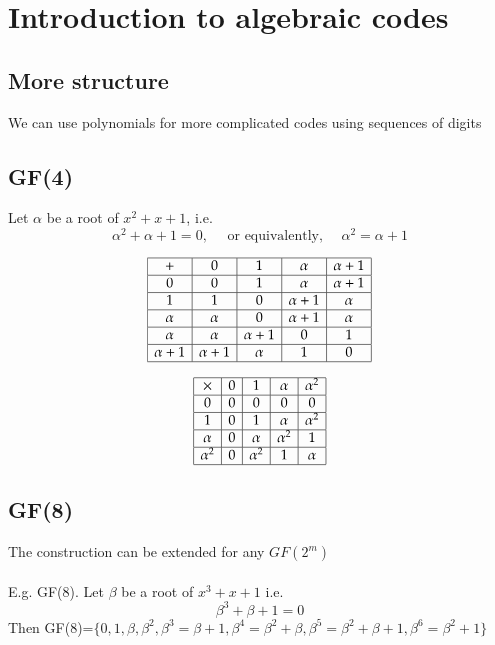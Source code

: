 \documentclass{article}[18pt]
\begin{document}
\section{Introduction to algebraic codes}
\subsection{More structure}
We can use polynomials for more complicated codes using sequences of digits
\subsection{GF(4)}
Let $\alpha$ be a root of $x^2+x+1$, i.e.
$$\alpha ^ { 2 } + \alpha + 1 = 0 , \quad \text { or equivalently, } \quad \alpha ^ { 2 } = \alpha + 1$$


$$\begin{array} { | c | c | c | c | c | } \hline + & { 0 } & { 1 } & { \alpha } & { \alpha + 1 } \\ \hline 0 & { 0 } & { 1 } & { \alpha } & { \alpha + 1 } \\ \hline 1 & { 1 } & { 0 } & { \alpha + 1 } & { \alpha } \\ \hline \alpha & { \alpha } & { 0 } & { \alpha + 1 } & { \alpha } \\ \hline \alpha & { \alpha } & { \alpha + 1 } & { 0 } & { 1 } \\ \hline \alpha + 1 & { \alpha + 1 } & { \alpha } & { 1 } & { 0 } \\ \hline \end{array}$$

$$\begin{array} { | c | c | c | c | c | } \hline \times & { 0 } & { 1 } & { \alpha } & { \alpha ^ { 2 } } \\ \hline 0 & { 0 } & { 0 } & { 0 } & { 0 } \\ \hline 1 & { 0 } & { 1 } & { \alpha } & { \alpha ^ { 2 } } \\ \hline \alpha & { 0 } & { \alpha } & { \alpha ^ { 2 } } & { 1 } \\ \hline \alpha ^ { 2 } & { 0 } & { \alpha ^ { 2 } } & { 1 } & { \alpha } \\ \hline \end{array}$$
\subsection{GF(8)}
The construction can be extended for any $GF(2^m)$\\
\\
E.g. GF(8). Let $\beta$ be a root of $x^3+x+1$ i.e.
$$\beta^3+\beta+1=0$$
Then GF(8)=$\{ 0,1 , \beta , \beta ^ { 2 } , \beta ^ { 3 } = \beta + 1 , \beta ^ { 4 } = \beta ^ { 2 } + \beta , \beta ^ { 5 } =\beta ^ { 2 } + \beta + 1 , \beta ^ { 6 } = \beta ^ { 2 } + 1 \}$
\end{document}
